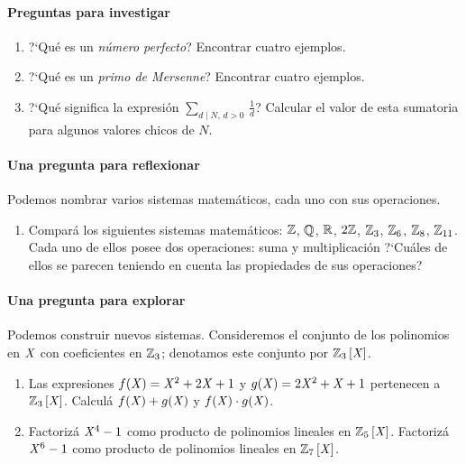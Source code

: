 
\paragraph{Preguntas para investigar}
\begin{enumerate}[label=P\arabic*]
	\item\label{item:perfectos}
		?`Qu\'e es un \emph{n\'umero perfecto}?
		Encontrar cuatro ejemplos.
	\item\label{item:mersenne}
		?`Qu\'e es un \emph{primo de Mersenne}?
		Encontrar cuatro ejemplos.
	\item\label{item:divisores}
		?`Qu\'e significa la expresi\'on
		\begin{math}
			\sum_{d\mid N,\,d>0}\,\frac 1 d
		\end{math}?
		Calcular el valor de esta sumatoria para algunos valores
		chicos de $N$.
	\seti
\end{enumerate}
%

\paragraph{Una pregunta para reflexionar}
Podemos nombrar varios sistemas matem\'aticos, cada uno con sus operaciones.
\begin{enumerate}[label=P\arabic*]
	\conti
	\item\label{item:sistemas}
		Compar\'a los siguientes sistemas matem\'aticos:
		$\Enteros$, $\Racionales$, $\Reales$, $2\Enteros$,
		$\Enterosmod[3]$, $\Enterosmod[6]$, $\Enterosmod[8]$,
		$\Enterosmod[11]$. Cada uno de ellos posee dos
		operaciones: suma y multiplicaci\'on ?`Cu\'ales de
		ellos se parecen teniendo en cuenta las propiedades
		de sus operaciones?
	\seti
\end{enumerate}
%

\paragraph{Una pregunta para explorar}
Podemos construir nuevos sistemas. Consideremos el conjunto de los
polinomios en $\indet$ con coeficientes en $\Enterosmod[3]$; denotamos
este conjunto por $\polinomios{\Enterosmod[3]}$.
\begin{enumerate}[label=P\arabic*]
	\conti
	\item\label{item:polinomios}
		Las expresiones $f(\indet)=\indet^2+2\indet+1$ y
		$g(\indet)=2\indet^2+\indet+1$ pertenecen a
		$\polinomios{\Enterosmod[3]}$. Calcul\'a
		$f(\indet)+g(\indet)$ y $f(\indet)\cdot g(\indet)$.
	\item\label{item:polinomios:factorizar}
		Factoriz\'a $\indet^4-1$ como producto de polinomios
		lineales en $\polinomios{\Enterosmod[5]}$.
		Factoriz\'a $\indet^6-1$ como producto de polinomios
		lineales en $\polinomios{\Enterosmod[7]}$.
	\seti
\end{enumerate}
%

